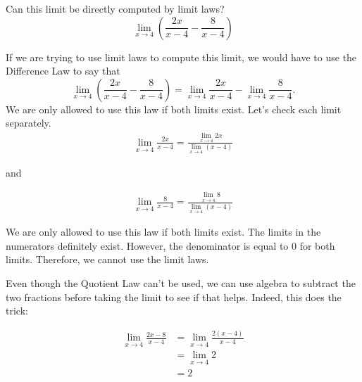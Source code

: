 \documentclass{ximera}
\begin{document}
\begin{question}
  Can this limit be directly computed by limit laws?
  \[
  \displaystyle\lim_{x\to 4}{\left(\frac{2x}{x-4}-\frac{8}{x-4}\right)}
  \]
  \begin{multipleChoice}
  \end{multipleChoice}
  \begin{feedback}
    If we are trying to use limit laws to compute this limit, we would have to use the Difference Law to say that
    \[
    \displaystyle\lim_{x\to 4}\left(\frac{2x}{x-4} - \frac{8}{x-4}\right)= \displaystyle\lim_{x\to 4}\frac{2x}{x-4} - \lim_{x\to 4}\frac{8}{x-4}.
    \]
    We are only allowed to use this law if both limits exist.  Let's
    check each limit separately.
    \begin{align*}
      \displaystyle\lim_{x\to 4}\frac{2x}{x-4}=\frac{\lim_{x\to 4}2x}{\lim_{x\to 4}(x-4)}
    \end{align*}

and

    \begin{align*}
      \displaystyle\lim_{x\to 4}\frac{8}{x-4}=\displaystyle\frac{\lim_{x\to 4}8}{\lim_{x\to 4}(x-4)}
    \end{align*}
    
   We are only allowed to use this law if both limits exist. The limits in the numerators definitely
   exist. However, the denominator is equal to $0$ for both limits. Therefore, we cannot use the limit laws. 
   
Even though the Quotient Law can't be used, we can use algebra to subtract the two fractions before taking the limit to see if that helps.  Indeed, this does the trick:
   
   \begin{align*}
   \displaystyle\lim_{x\to 4}\frac{2x-8}{x-4}&=\lim_{x\to 4}\frac{2(x-4)}{x-4}\\
   &=\lim_{x\to 4}2\\
   &=2
  \end{align*}
  \end{feedback}
\end{question}
\end{document}
